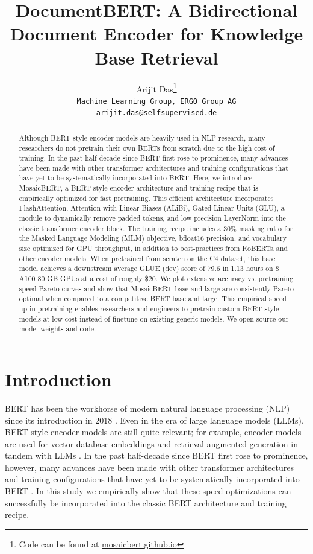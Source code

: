 \documentclass{article}
\title{DocumentBERT: A Bidirectional Document Encoder for Knowledge Base Retrieval}
\author{%
  Arijit Das\thanks{Code can be found at \href{https://mosaicbert.github.io}{\url{mosaicbert.github.io}}} \\
  \texttt{Machine Learning Group, ERGO Group AG}\\
  \texttt{arijit.das@selfsupervised.de}\\
}
\begin{document}
\maketitle

\begin{abstract}
Although BERT-style encoder models are heavily used in NLP research, many researchers do not pretrain their own BERTs from scratch due to the high cost of training.
% 
In the past half-decade since BERT first rose to prominence, many advances have been made with other transformer architectures and training configurations that have yet to be systematically incorporated into BERT.
% 
Here, we introduce MosaicBERT, a BERT-style encoder architecture and training recipe that is empirically optimized for fast pretraining.
% 
This efficient architecture incorporates FlashAttention, Attention with Linear Biases (ALiBi), Gated Linear Units (GLU), a module to dynamically remove padded tokens, and low precision LayerNorm into the classic transformer encoder block.
% 
The training recipe includes a 30\% masking ratio for the Masked Language Modeling (MLM) objective, bfloat16 precision, and vocabulary size optimized for GPU throughput, in addition to best-practices from RoBERTa and other encoder models.
% 
When pretrained from scratch on the C4 dataset, this base model achieves a downstream average GLUE (dev) score of 79.6 in 1.13 hours on 8 A100 80 GB GPUs at a cost of roughly \$20.
% 
We plot extensive accuracy vs. pretraining speed Pareto curves and show that MosaicBERT base and large are consistently Pareto optimal when compared to a competitive BERT base and large.
% 
This empirical speed up in pretraining enables researchers and engineers to pretrain custom BERT-style models at low cost instead of finetune on existing generic models. 
We open source our model weights and code.
\end{abstract}



\section{Introduction}


BERT has been the workhorse of modern natural language processing (NLP) since its introduction in 2018 \citep{devlin2018bert}. 
Even in the era of large language models (LLMs), BERT-style encoder models are still quite relevant; for example, encoder models are used for vector database embeddings and retrieval augmented generation in tandem with LLMs \citep{karpukhin2020dense,lewis2020retrieval,izacard2022unsupervised,wang2022text,shi2023replug}.
In the past half-decade since BERT first rose to prominence, however, many advances have been made with other transformer architectures and training configurations that have yet to be systematically incorporated into BERT \citep{dauphin2017language,press2021train,dao2022flashattention}. In this study we empirically show that these speed optimizations can successfully be incorporated into the classic BERT architecture and training recipe.
\end{document}
